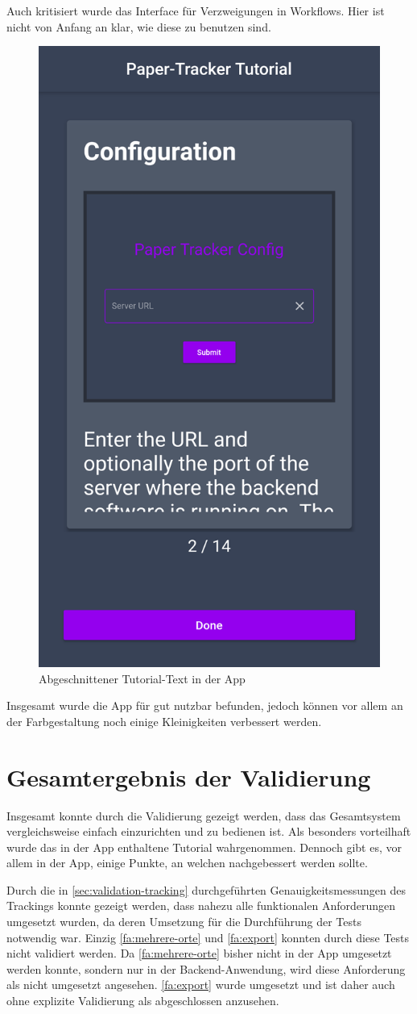 Auch kritisiert wurde das Interface für Verzweigungen in Workflows. Hier ist nicht von Anfang an
klar, wie diese zu benutzen sind.

\begin{figure}[htbp]
	\centering
	\includegraphics[width=.3\textwidth]{images/screenshot_app_tutorial_feedback.png}
	\caption{Abgeschnittener Tutorial-Text in der App}
	\label{fig:tutorial-feedback}
\end{figure}

Insgesamt wurde die App für gut nutzbar befunden, jedoch können vor allem an der
Farbgestaltung noch einige Kleinigkeiten verbessert werden.

\section{Gesamtergebnis der Validierung}

Insgesamt konnte durch die Validierung gezeigt werden, dass das Gesamtsystem vergleichsweise einfach
einzurichten und zu bedienen ist. Als besonders vorteilhaft wurde das in der App enthaltene Tutorial
wahrgenommen. Dennoch gibt es, vor allem in der App, einige Punkte, an welchen nachgebessert werden
sollte.

Durch die in \autoref{sec:validation-tracking} durchgeführten Genauigkeitsmessungen des Trackings
konnte gezeigt werden, dass nahezu alle funktionalen Anforderungen umgesetzt wurden, da deren
Umsetzung für die Durchführung der Tests notwendig war. Einzig \ref{fa:mehrere-orte} und
\ref{fa:export} konnten durch diese Tests nicht validiert werden. Da \ref{fa:mehrere-orte} bisher
nicht in der App umgesetzt werden konnte, sondern nur in der Backend-Anwendung, wird diese
Anforderung als nicht umgesetzt angesehen. \ref{fa:export} wurde umgesetzt und ist daher auch ohne
explizite Validierung als abgeschlossen anzusehen.

